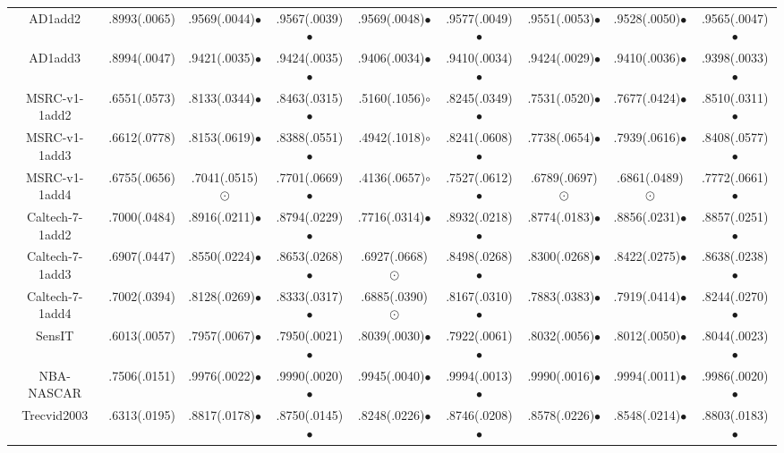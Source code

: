 \documentclass[10pt,journal,compsoc]{IEEEtran}
\begin{document}
\begin{table*}[!t]
{\begin{tabular}{c|| c c c c c c c c }
AD1add2         & .8993(.0065)& .9569(.0044)$\bullet$ & .9567(.0039)$\bullet$ & .9569(.0048)$\bullet$ & .9577(.0049)$\bullet$ & .9551(.0053)$\bullet$ & .9528(.0050)$\bullet$ & .9565(.0047)$\bullet$ \\
AD1add3         & .8994(.0047)& .9421(.0035)$\bullet$ & .9424(.0035)$\bullet$ & .9406(.0034)$\bullet$ & .9410(.0034)$\bullet$ & .9424(.0029)$\bullet$ & .9410(.0036)$\bullet$ & .9398(.0033)$\bullet$ \\
MSRC-v1-1add2   & .6551(.0573)& .8133(.0344)$\bullet$ & .8463(.0315)$\bullet$ & .5160(.1056)$\circ$ & .8245(.0349)$\bullet$ & .7531(.0520)$\bullet$ & .7677(.0424)$\bullet$ & .8510(.0311)$\bullet$ \\
MSRC-v1-1add3   & .6612(.0778)& .8153(.0619)$\bullet$ & .8388(.0551)$\bullet$ & .4942(.1018)$\circ$ & .8241(.0608)$\bullet$ & .7738(.0654)$\bullet$ & .7939(.0616)$\bullet$ & .8408(.0577)$\bullet$ \\
MSRC-v1-1add4   & .6755(.0656)& .7041(.0515){\tiny $\odot$} & .7701(.0669)$\bullet$ & .4136(.0657)$\circ$ & .7527(.0612)$\bullet$ & .6789(.0697){\tiny $\odot$} & .6861(.0489){\tiny $\odot$} & .7772(.0661)$\bullet$ \\
Caltech-7-1add2 & .7000(.0484)& .8916(.0211)$\bullet$ & .8794(.0229)$\bullet$ & .7716(.0314)$\bullet$ & .8932(.0218)$\bullet$ & .8774(.0183)$\bullet$ & .8856(.0231)$\bullet$ & .8857(.0251)$\bullet$ \\
Caltech-7-1add3 & .6907(.0447)& .8550(.0224)$\bullet$ & .8653(.0268)$\bullet$ & .6927(.0668){\tiny $\odot$} & .8498(.0268)$\bullet$ & .8300(.0268)$\bullet$ & .8422(.0275)$\bullet$ & .8638(.0238)$\bullet$ \\
Caltech-7-1add4 & .7002(.0394)& .8128(.0269)$\bullet$ & .8333(.0317)$\bullet$ & .6885(.0390){\tiny $\odot$} & .8167(.0310)$\bullet$ & .7883(.0383)$\bullet$ & .7919(.0414)$\bullet$ & .8244(.0270)$\bullet$ \\
\hline \hline
SensIT          & .6013(.0057)& .7957(.0067)$\bullet$ & .7950(.0021)$\bullet$ & .8039(.0030)$\bullet$ & .7922(.0061)$\bullet$ & .8032(.0056)$\bullet$ & .8012(.0050)$\bullet$ & .8044(.0023)$\bullet$ \\
NBA-NASCAR      & .7506(.0151)& .9976(.0022)$\bullet$ & .9990(.0020)$\bullet$ & .9945(.0040)$\bullet$ & .9994(.0013)$\bullet$ & .9990(.0016)$\bullet$ & .9994(.0011)$\bullet$ & .9986(.0020)$\bullet$ \\
Trecvid2003     & .6313(.0195)& .8817(.0178)$\bullet$ & .8750(.0145)$\bullet$ & .8248(.0226)$\bullet$ & .8746(.0208)$\bullet$ & .8578(.0226)$\bullet$ & .8548(.0214)$\bullet$ & .8803(.0183)$\bullet$ \\

\end{tabular}}
\end{table*}
\end{document}

